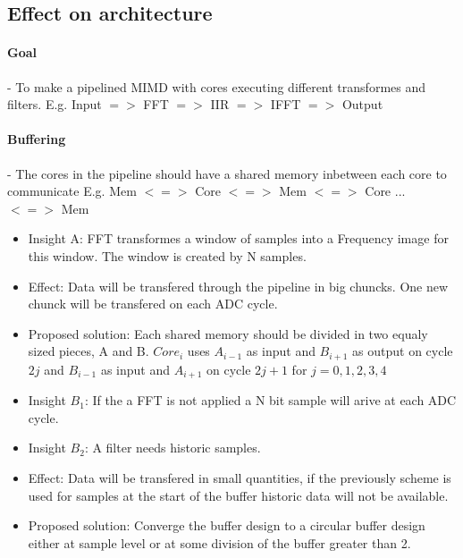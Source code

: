 \subsection{Effect on architecture}

\paragraph{Goal}
 - To make a pipelined MIMD with cores executing different transformes and filters.
   E.g. Input $=>$ FFT $=>$ IIR $=>$ IFFT $=>$ Output

\paragraph{Buffering}
 - The cores in the pipeline should have a shared memory inbetween each core to communicate
   E.g. Mem $<=>$ Core $<=>$ Mem $<=>$ Core ... $<=>$ Mem

\begin{itemize}
	\item Insight A: FFT transformes a window of samples into a Frequency image for this window. The window is created by N samples.
  \item Effect: Data will be transfered through the pipeline in big chuncks. One new chunck will be transfered on each ADC cycle.
  \item Proposed solution: Each shared memory should be divided in two equaly sized pieces, A and B. $Core_i$ uses $A_{i-1}$ as input and $B_{i+1}$ as output on cycle $2j$ and $B_{i-1}$ as input and $A_{i+1}$ on cycle $2j+1$ for $j = 0,1,2,3,4$
\end{itemize}


\begin{itemize}
	\item Insight $B_1$: If the a FFT is not applied a N bit sample will arive at each ADC cycle.
  \item Insight $B_2$: A filter needs historic samples.
  \item Effect: Data will be transfered in small quantities, if the previously scheme is used for samples at the start of the buffer historic data will not be available.
  \item Proposed solution: Converge the buffer design to a circular buffer design either at sample level or at some division of the buffer greater than 2.
\end{itemize}



